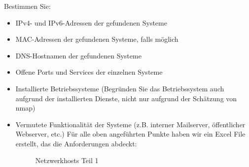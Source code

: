 \documentclass[12pt,a4paper,titlepage,oneside]{scrartcl}
\begin{document}
Bestimmen Sie:
\begin{itemize}
\item IPv4- und IPv6-Adressen der gefundenen Systeme
\item MAC-Adressen der gefundenen Systeme, falls möglich
\item DNS-Hostnamen der gefundenen Systeme
\item Offene Ports und Services der einzelnen Systeme
\item Installierte Betriebssysteme (Begründen Sie das Betriebssystem auch aufgrund der installierten Dienste, nicht nur aufgrund der Schätzung von nmap)
\item Vermutete Funktionalität der Systeme (z.B. interner Mailserver, öffentlicher Webserver, etc.)
Für alle oben angeführten Punkte haben wir ein Excel File erstellt, das die Anforderungen abdeckt:

\newpage
\begin{figure}[h!]
  \centering
  \caption{Netzwerkhosts Teil 1}
  \label{fig:logo11}
\end{figure}


\end{itemize}
\end{document}
